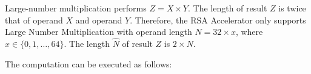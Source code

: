 \documentclass[main\_\_EN.tex]{subfiles}
\begin{document}
Large-number multiplication performs \begin{math}Z = X \times Y\end{math}. The length of result \begin{math}Z\end{math} is twice that of operand \begin{math}X\end{math} and operand \begin{math}Y\end{math}. Therefore, the RSA Accelerator only supports Large Number Multiplication with operand length \begin{math}N = 32 \times x\end{math}, where \begin{math}x \in \{ 0, 1, \dots, 64\}\end{math}. The length \begin{math}\hat{N}\end{math} of result \begin{math}Z\end{math} is \begin{math}2 \times N\end{math}.

The computation can be executed as follows:
\end{document}

